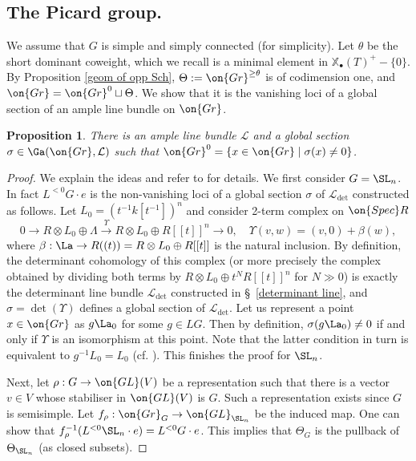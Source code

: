 \documentclass[]{pcmi}
\theoremstyle{plain}
\newtheorem{prop}[equation]{Proposition}
\theoremstyle{remark}
\theoremstyle{definition}
\newcommand{\mL}{{\mathcal L}}
\newcommand{\Gr}{{\on{Gr}}}
\newcommand{\Spec}{\on{Spec}}
\newcommand{\GL}{{\on{GL}}}
\def\xcoch{\mathbb{X}_\bullet}
\begin{document}
\subsection{The Picard group.}\label{The Picard group}
We assume that $G$ is simple and simply connected (for simplicity). Let $\theta$ be the short dominant coweight, which we recall is a minimal element in $\xcoch(T)^+-\{0\}$. By Proposition \ref{geom of opp Sch}, $\Theta:=\Gr^{\geq \theta}$ is of codimension one, and $\Gr=\Gr^0\sqcup \Theta$. We show that it is the vanishing loci of a global section of an ample line bundle on $\Gr$.

\begin{prop}\label{big cell 2}
There is an ample line bundle $\mL$ and a global section $\sigma\in\Ga(\Gr,\mL)$ such that $\Gr^0=\{x\in\Gr \mid \sigma(x)\neq 0\}$.
\end{prop}
\begin{proof}We explain the ideas and refer to \cite[Lemma 2, Corollary 3]{Fa} for details.
We first consider $G=\SL_n$. In fact $L^{<0}G\cdot e$ is the non-vanishing loci of a global section $\sigma$ of $\mL_{\det}$ constructed as follows. Let $L_0=(t^{-1}k[t^{-1}])^n$ and consider 2-term complex on $\Spec R$
\[0\to R\otimes L_0\oplus\Lambda\stackrel{\Upsilon}{\to} R\otimes L_0\oplus R[[t]]^n\to 0,\quad \Upsilon(v,w)=(v,0)+\beta(w),\]
where $\beta: \La\to R((t))=R\otimes L_0\oplus R[[t]]$ is the natural inclusion.
By definition, the determinant cohomology of this complex (or more precisely the complex obtained by dividing both terms by $ R\otimes L_0\oplus t^NR[[t]]^n$ for $N\gg 0$) is exactly the determinant line bundle $\mL_{\det}$ constructed in \S~\ref{determinant line}, and $\sigma=\det(\Upsilon)$ defines a global section of $\mL_{\det}$. Let us represent a point $x\in \Gr$ as $g\La_0$ for some $g\in LG$. Then by definition, $\sigma(g\La_0)\neq 0$ if and only if $\Upsilon$ is an isomorphism at this point. Note that the latter condition in turn is equivalent to $g^{-1} L_0=L_0$ (cf. \cite[Lemma 2]{Fa}). This finishes the proof for $\SL_n$.

Next, let $\rho:G\to \GL(V)$ be a representation such that there is a vector $v\in V$ whose stabiliser in $\GL(V)$ is $G$. Such a representation exists since $G$ is semisimple. Let $f_\rho: \Gr_G\to \GL_{\SL_n}$ be the induced map.
One can show that $f_\rho^{-1}(L^{<0}\SL_n\cdot e)=L^{<0}G\cdot e$. This implies that $\Theta_G$ is the pullback of $\Theta_{\SL_n}$ (as closed subsets). 
\end{proof}
\end{document}

